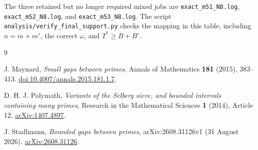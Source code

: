 \documentclass[11pt]{article}
\theoremstyle{definition}
\theoremstyle{remark}
\begin{document}
The three retained but no longer required mixed jobs are
\texttt{exact\_m51\_N8.log}, \texttt{exact\_m52\_N8.log}, and
\texttt{exact\_m53\_N8.log}.  The script
\texttt{analysis/verify\_final\_support.py} checks the mapping in this table,
including \(n=m+m'\), the correct \(\omega\), and \(T^*\geq B+B'\).

\begin{thebibliography}{9}

J. Maynard,
\emph{Small gaps between primes},
Annals of Mathematics \textbf{181} (2015), 383--413.
\href{https://doi.org/10.4007/annals.2015.181.1.7}
{doi:10.4007/annals.2015.181.1.7}.

D. H. J. Polymath,
\emph{Variants of the Selberg sieve, and bounded intervals containing many primes},
Research in the Mathematical Sciences \textbf{1} (2014), Article 12.
\href{https://arxiv.org/abs/1407.4897}{arXiv:1407.4897}.

J. Stadlmann,
\emph{Bounded gaps between primes},
arXiv:2608.31126v1 (31 August 2026).
\href{https://arxiv.org/abs/2608.31126}{arXiv:2608.31126}.

\end{thebibliography}
\end{document}
